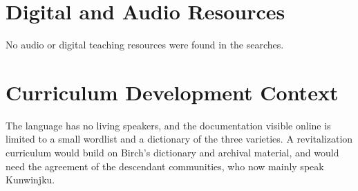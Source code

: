 \documentclass[12pt]{article}
\begin{document}
\section{Digital and Audio Resources}
No audio or digital teaching resources were found in the searches.

\section{Curriculum Development Context}
The language has no living speakers, and the documentation visible online is limited to a small wordlist and a dictionary of the three varieties. A revitalization curriculum would build on Birch's dictionary and archival material, and would need the agreement of the descendant communities, who now mainly speak Kunwinjku.
\end{document}
